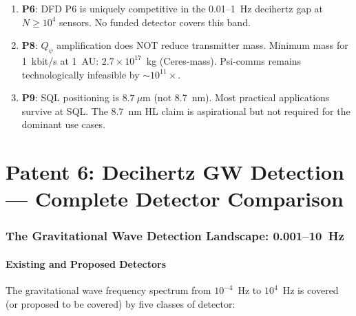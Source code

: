 \documentclass[11pt]{article}
\theoremstyle{definition}
\theoremstyle{remark}
\newcommand{\ee}[1]{\times10^{#1}}
\newcommand{\Qpsi}{Q_\psi}
\begin{document}
\begin{tcolorbox}[colback=blue!5!white, colframe=blue!60!black,
  title=\textbf{CRITICAL W3i7 RESULTS --- READ FIRST}]
\begin{enumerate}[nosep]
\item \textbf{P6}: DFD P6 is uniquely competitive in the 0.01--1~Hz decihertz
  gap at $N \geq 10^4$ sensors. No funded detector covers this band.
\item \textbf{P8}: $\Qpsi$ amplification does NOT reduce transmitter mass.
  Minimum mass for 1~kbit/s at 1~AU: $2.7\ee{17}$~kg (Ceres-mass).
  Psi-comms remains technologically infeasible by $\sim 10^{11}\times$.
\item \textbf{P9}: SQL positioning is $8.7~\mu$m (not 8.7~nm).
  Most practical applications survive at SQL. The 8.7~nm HL claim is
  aspirational but not required for the dominant use cases.
\end{enumerate}
\end{tcolorbox}

\part{Patent 6: Decihertz GW Detection --- Complete Detector Comparison}
\label{part:P6}

\section{The Gravitational Wave Detection Landscape: 0.001--10~Hz}
\label{sec:P6-landscape}

\subsection{Existing and Proposed Detectors}

The gravitational wave frequency spectrum from $10^{-4}$~Hz to $10^4$~Hz is
covered (or proposed to be covered) by five classes of detector:
\end{document}
